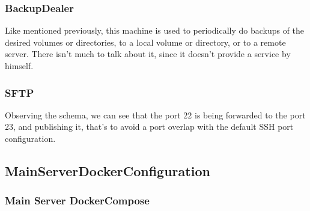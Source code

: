     \subsubsection[Backup\_dealer]{BackupDealer}
    \begin{flushleft}
       Like mentioned previously, this machine is used to periodically do backups of the desired volumes or directories,
       to a local volume or directory, or to a remote server.
       There isn't much to talk about it, since it doesn't provide a service by himself.
    \end{flushleft}

    \subsubsection[SFTP]{SFTP}
    \begin{flushleft}
        Observing the schema, we can see that the port 22 is being forwarded to the port 23, and publishing it, that's
        to avoid a port overlap with the default SSH port configuration.
    \end{flushleft}



    \newpage
    \subsection[Main Server Docker Configuration]{MainServerDockerConfiguration}\label{subsec:mainserverdockerconfiguration}
    \subsubsection[Main Server Docker-Compose]{Main Server DockerCompose}
    
